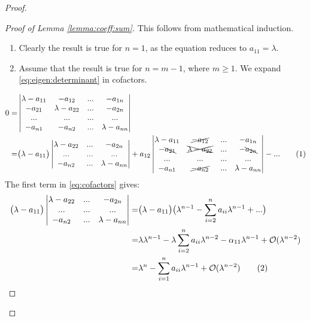 \documentclass[]{article}
\newcommand\numberthis{\addtocounter{equation}{1}\tag{\theequation}}
\begin{document}
\begin{proof}
	\begin{proof}[Proof of Lemma \ref{lemma:coeff:sum}]
		This follows from mathematical induction.
		\begin{enumerate}
			\item Clearly the result is true for $n=1$, as the equation reduces to $a_{11}=\lambda$.
			\item Assume that the result is true for $n=m-1$, where $m\ge 1$. We expand \eqref{eq:eigen:determinant} in cofactors.
		\end{enumerate}
		\begin{align*}
			0=&\begin{vmatrix}
				\lambda-a_{11}&-a_{12}&...&-a_{1n}\\
				-a_{21}&\lambda-a_{22}&...&-a_{2n}\\
				...&...&...&...\\
				-a_{n1}&-a_{n2}&...&\lambda-a_{nn}
			\end{vmatrix}\\=& \big(\lambda-a_{11}\big)\begin{vmatrix}
				\lambda-a_{22}&...&-a_{2n}\\
				...&...&...\\
				-a_{n2}&...&\lambda-a_{nn}
			\end{vmatrix}+a_{12}\begin{vmatrix}
				\lambda-a_{11}&\cancel{-a_{12}}&...&-a_{1n}\\
				-\bcancel{a_{21}}&\xcancel{\lambda-a_{22}}&...&-\bcancel{a_{2n}}\\
				...&...&...&...\\
				-a_{n1}&\cancel{-a_{n2}}&...&\lambda-a_{nn}
			\end{vmatrix} - ... \numberthis \label{eq:cofactors}
		\end{align*}
		The first term in \eqref{eq:cofactors} gives:
		\begin{align*}
			\big(\lambda-a_{11}\big)\begin{vmatrix}
				\lambda-a_{22}&...&-a_{2n}\\
				...&...&...\\
				-a_{n2}&...&\lambda-a_{nn}
			\end{vmatrix}=&	\big(\lambda-a_{11}\big) \big(\lambda^{n-1} - \sum_{i=2}^{n}a_{ii}\lambda^{n-1}+...\big)	\\
			=& \lambda \lambda^{n-1} - \lambda \sum_{i=2}^{n}a_{ii}\lambda^{n-2} - \alpha_{11}\lambda^{n-1} + \mathcal{O}(\lambda^{n-2})\\
			=& \lambda^n - \sum_{i=1}^{n}a_{ii}\lambda^{n-1}+ \mathcal{O}(\lambda^{n-2}) \numberthis \label{eq:cofactor1}
		\end{align*}
	\end{proof}
		

\end{proof}
\end{document}
